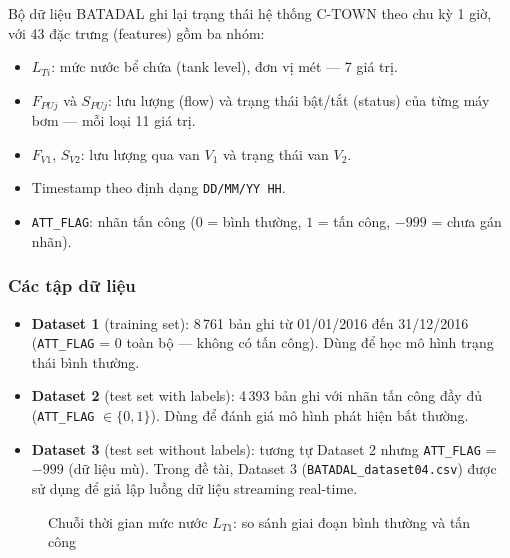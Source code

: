 Bộ dữ liệu BATADAL ghi lại trạng thái hệ thống C-TOWN theo chu kỳ 1 giờ, với
43 đặc trưng (features) gồm ba nhóm:

\begin{itemize}
  \item $L_{Ti}$: mức nước bể chứa (tank level), đơn vị mét --- 7 giá trị.
  \item $F_{PUj}$ và $S_{PUj}$: lưu lượng (flow) và trạng thái bật/tắt (status)
    của từng máy bơm --- mỗi loại 11 giá trị.
  \item $F_{V1}$, $S_{V2}$: lưu lượng qua van $V_1$ và trạng thái van $V_2$.
  \item Timestamp theo định dạng \texttt{DD/MM/YY HH}.
  \item \texttt{ATT\_FLAG}: nhãn tấn công ($0$ = bình thường, $1$ = tấn công,
    $-999$ = chưa gán nhãn).
\end{itemize}

\subsubsection{Các tập dữ liệu}

\begin{itemize}
  \item \textbf{Dataset 1} (training set): 8\,761 bản ghi từ 01/01/2016 đến
    31/12/2016 (\texttt{ATT\_FLAG} = 0 toàn bộ --- không có tấn công). Dùng
    để học mô hình trạng thái bình thường.
  \item \textbf{Dataset 2} (test set with labels): 4\,393 bản ghi với nhãn
    tấn công đầy đủ (\texttt{ATT\_FLAG} $\in \{0,1\}$). Dùng để đánh giá mô hình
    phát hiện bất thường.
  \item \textbf{Dataset 3} (test set without labels): tương tự Dataset 2 nhưng
    \texttt{ATT\_FLAG} = $-999$ (dữ liệu mù). Trong đề tài, Dataset 3
    (\texttt{BATADAL\_dataset04.csv}) được sử dụng để giả lập luồng dữ liệu
    streaming real-time.
\end{itemize}

\begin{figure}[H]
  \centering
  \setlength{\fboxsep}{12pt}
  \caption{Chuỗi thời gian mức nước $L_{T1}$: so sánh giai đoạn bình thường và tấn công}
  \label{fig:batadal-timeseries}
\end{figure}

